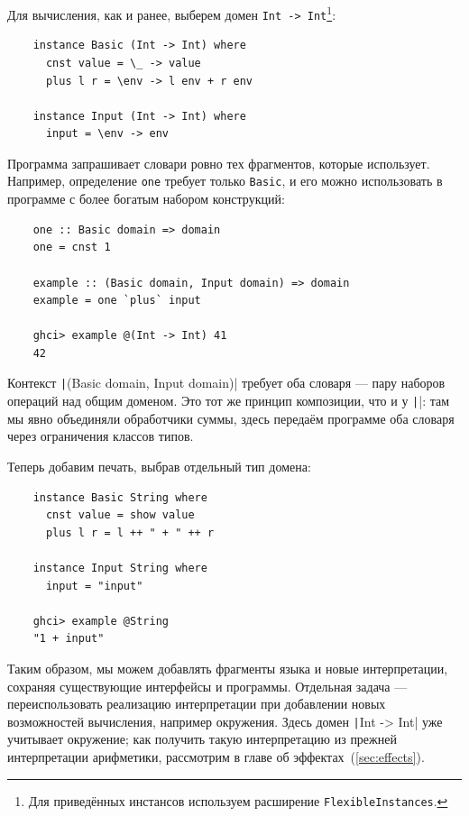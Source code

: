 Для вычисления, как и ранее, выберем домен \texttt{Int -> Int}\footnote{Для приведённых инстансов используем расширение \texttt{FlexibleInstances}.}:
\begin{verbatim}
    instance Basic (Int -> Int) where
      cnst value = \_ -> value
      plus l r = \env -> l env + r env

    instance Input (Int -> Int) where
      input = \env -> env
\end{verbatim}

Программа запрашивает словари ровно тех фрагментов, которые использует.
Например, определение \texttt{one} требует только \texttt{Basic}, и его можно использовать в программе с более богатым набором конструкций:
\begin{verbatim}
    one :: Basic domain => domain
    one = cnst 1

    example :: (Basic domain, Input domain) => domain
    example = one `plus` input

    ghci> example @(Int -> Int) 41
    42
\end{verbatim}

Контекст \texttt|(Basic domain, Input domain)| требует оба словаря --- пару наборов операций над общим доменом.
Это тот же принцип композиции, что и у \texttt|\/|: там мы явно объединяли обработчики суммы, здесь передаём программе оба словаря через ограничения классов типов.

Теперь добавим печать, выбрав отдельный тип домена:
\begin{verbatim}
    instance Basic String where
      cnst value = show value
      plus l r = l ++ " + " ++ r

    instance Input String where
      input = "input"

    ghci> example @String
    "1 + input"
\end{verbatim}

Таким образом, мы можем добавлять фрагменты языка и новые интерпретации, сохраняя существующие интерфейсы и программы.
Отдельная задача --- переиспользовать реализацию интерпретации при добавлении новых возможностей вычисления, например окружения.
Здесь домен \texttt|Int -> Int| уже учитывает окружение; как получить такую интерпретацию из прежней интерпретации арифметики, рассмотрим в главе об эффектах~(\ref{sec:effects}).

